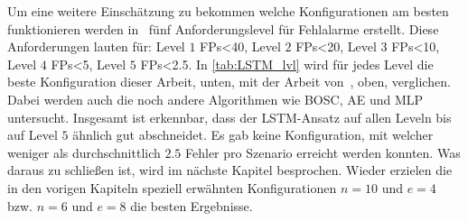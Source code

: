    Um eine weitere Einschätzung zu bekommen welche Konfigurationen am besten funktionieren werden in~\cite{IDSTHREADGRIMMER2021} fünf Anforderungslevel für Fehlalarme erstellt.
    Diese Anforderungen lauten für: Level $1$ \acp{FP}<40, Level $2$ \acp{FP}<20, Level $3$ \acp{FP}<10, Level $4$ \acp{FP}<5, Level $5$ \acp{FP}<2.5.
    In \autoref{tab:LSTM_lvl} wird für jedes Level die beste Konfiguration dieser Arbeit, unten, mit der Arbeit von~\cite{IDSTHREADGRIMMER2021}, oben, verglichen.
    Dabei werden auch die noch andere Algorithmen wie \ac{BOSC}, \ac{AE} und \ac{MLP} untersucht.
    Insgesamt ist erkennbar, dass der \ac{LSTM}-Ansatz auf allen Leveln bis auf Level $5$ ähnlich gut abschneidet.
    Es gab keine Konfiguration, mit welcher weniger als durchschnittlich $2.5$ Fehler pro Szenario erreicht werden konnten.
    Was daraus zu schließen ist, wird im nächste Kapitel besprochen.
    Wieder erzielen die in den vorigen Kapiteln speziell erwähnten Konfigurationen $n=10$ und $e=4$ bzw. $n=6$ und $e=8$ die besten Ergebnisse.

